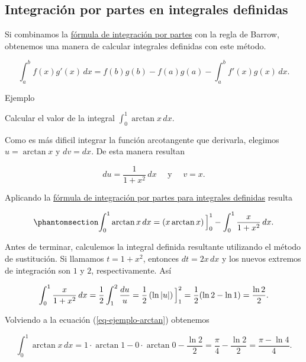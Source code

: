 \documentclass[
  letterpaper,
]{book}
\theoremstyle{plain}
\theoremstyle{remark}
\begin{document}
\subsection{Integración por partes en integrales
definidas}\label{integraciuxf3n-por-partes-en-integrales-definidas}

Si combinamos la \hyperref[form-partes1]{fórmula de integración por
partes} con la regla de Barrow, obtenemos una manera de calcular
integrales definidas con este método.

\label{form-partes-definida}
\[
\int_a^b f(x)g'(x)\,dx = f(b)g(b) - f(a)g(a) - \int_a^b f'(x)g(x)\,dx.
\]

Ejemplo

Calcular el valor de la integral
\(\displaystyle \int_0^1 \arctan x\,dx\).

\begin{tcolorbox}[enhanced jigsaw, opacityback=0, left=2mm, opacitybacktitle=0.6, toprule=.15mm, bottomrule=.15mm, colbacktitle=quarto-callout-tip-color!10!white, titlerule=0mm, bottomtitle=1mm, title=\textcolor{quarto-callout-tip-color}{\faLightbulb}\hspace{0.5em}{Solución}, toptitle=1mm, colframe=quarto-callout-tip-color-frame, colback=white, breakable, rightrule=.15mm, arc=.35mm, leftrule=.75mm, coltitle=black]

Como es más dificil integrar la función arcotangente que derivarla,
elegimos \(u=\arctan x\) y \(dv=dx\). De esta manera resultan

\[
du=\frac{1}{1+x^2}\,dx \quad \text{ y }\quad v=x.
\]

Aplicando la \hyperref[form-partes-definida]{fórmula de integración por
partes para integrales definidas} resulta

\begin{equation}\phantomsection\label{eq-ejemplo-arctan}{
\int_0^1 \arctan x\,dx=\left(x\arctan x\right)\Big{]}_{0}^1-\int_0^1 \frac{x}{1+x^2}\,dx.
}\end{equation}

Antes de terminar, calculemos la integral definida resultante utilizando
el método de sustitución. Si llamamos \(t=1+x^2\), entonces
\(dt=2x\,dx\) y los nuevos extremos de integración son \(1\) y \(2\),
respectivamente. Así

\[
\int_0^1 \frac{x}{1+x^2}\,dx=\frac{1}{2}\int_1^2 \frac{du}{u}=\frac{1}{2}\left(\ln |u|\right)\Big{]}_1^2=\frac{1}{2}(\ln 2-\ln 1)=\frac{\ln 2}{2}. 
\]

Volviendo a la ecuación (\ref{eq-ejemplo-arctan}) obtenemos

\[
\int_0^1 \arctan x\,dx=1\cdot \arctan 1-0\cdot \arctan 0-\frac{\ln 2}{2}=\frac{\pi}{4}-\frac{\ln 2}{2}=\frac{\pi-\ln 4}{4}.
\]

\end{tcolorbox}
\end{document}
